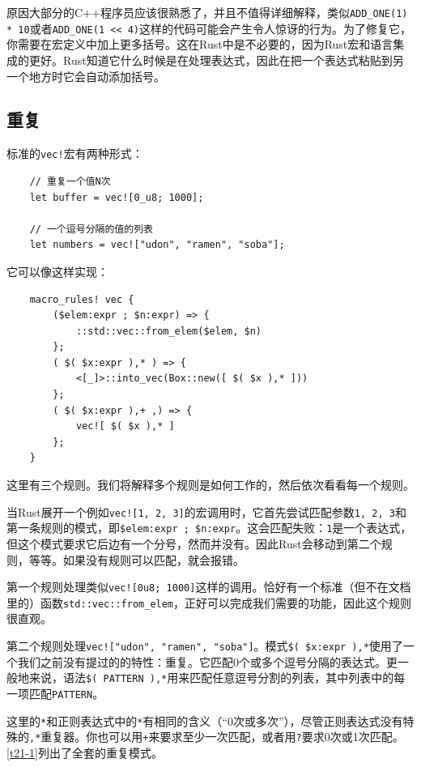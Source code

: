 原因大部分的C++程序员应该很熟悉了，并且不值得详细解释，类似\texttt{ADD\_ONE(1) * 10}或者\texttt{ADD\_ONE(1 << 4)}这样的代码可能会产生令人惊讶的行为。为了修复它，你需要在宏定义中加上更多括号。这在Rust中是不必要的，因为Rust宏和语言集成的更好。Rust知道它什么时候是在处理表达式，因此在把一个表达式粘贴到另一个地方时它会自动添加括号。

\subsection{重复}
标准的\texttt{vec!}宏有两种形式：
\begin{verbatim}
    // 重复一个值N次
    let buffer = vec![0_u8; 1000];

    // 一个逗号分隔的值的列表
    let numbers = vec!["udon", "ramen", "soba"];
\end{verbatim}

它可以像这样实现：
\begin{verbatim}
    macro_rules! vec {
        ($elem:expr ; $n:expr) => {
            ::std::vec::from_elem($elem, $n)
        };
        ( $( $x:expr ),* ) => {
            <[_]>::into_vec(Box::new([ $( $x ),* ]))
        };
        ( $( $x:expr ),+ ,) => {
            vec![ $( $x ),* ]
        };
    }
\end{verbatim}

这里有三个规则。我们将解释多个规则是如何工作的，然后依次看看每一个规则。

当Rust展开一个例如\texttt{vec![1, 2, 3]}的宏调用时，它首先尝试匹配参数\texttt{1, 2, 3}和第一条规则的模式，即\texttt{\$elem:expr ; \$n:expr}。这会匹配失败：\texttt{1}是一个表达式，但这个模式要求它后边有一个分号，然而并没有。因此Rust会移动到第二个规则，等等。如果没有规则可以匹配，就会报错。

第一个规则处理类似\texttt{vec![0u8; 1000]}这样的调用。恰好有一个标准（但不在文档里的）函数\texttt{std::vec::from\_elem}，正好可以完成我们需要的功能，因此这个规则很直观。

第二个规则处理\texttt{vec!["udon", "ramen", "soba"]}。模式\texttt{\$( \$x:expr ),*}使用了一个我们之前没有提过的的特性：重复。它匹配0个或多个逗号分隔的表达式。更一般地来说，语法\texttt{\$( PATTERN ),*}用来匹配任意逗号分割的列表，其中列表中的每一项匹配\texttt{PATTERN}。

这里的\texttt{*}和正则表达式中的\texttt{*}有相同的含义（“0次或多次”），尽管正则表达式没有特殊的\texttt{,*}重复器。你也可以用\texttt{+}来要求至少一次匹配，或者用\texttt{?}要求0次或1次匹配。\autoref{t21-1}列出了全套的重复模式。

